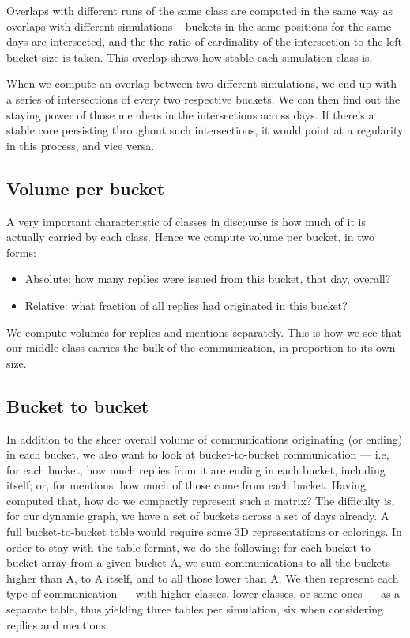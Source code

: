 \documentclass[10pt,oneside]{memoir}
\begin{document}
Overlaps with different runs of the same class are computed in the same way as overlaps with different simulations -- buckets in the same positions for the same days are intersected, and the the ratio of cardinality of the intersection to the left bucket size is taken.  This overlap shows how stable each simulation class is.


When we compute an overlap between two different simulations, we end up with a series of intersections of every two respective buckets.  We can then find out the staying power of those members in the intersections across days.  If there's a stable core persisting throughout such intersections, it would point at a regularity in this process, and vice versa.


\pagebreak \subsection{Volume per bucket}
\label{volumeperbucket}

A very important characteristic of classes in discourse is how much of it is actually carried by each class.  Hence we compute volume per bucket, in two forms:


\begin{itemize}


\item Absolute: how many replies were issued from this bucket, that day, overall?

\item Relative: what fraction of all replies had originated in this bucket?
\end{itemize}

We compute volumes for replies and mentions separately.  This is how we see that our middle class carries the bulk of the communication, in proportion to its own size.  


\subsection{Bucket to bucket}
\label{buckettobucket}

In addition to the sheer overall volume of communications originating (or ending) in each bucket, we also want to look at bucket-to-bucket communication --- i.e, for each bucket, how much replies from it are ending in each bucket, including itself; or, for mentions, how much of those come from each bucket.
Having computed that, how do we compactly represent such a matrix?  The difficulty is, for our dynamic graph, we have a set of buckets across a set of days already.  A full bucket-to-bucket table would require some 3D representations or colorings.  In order to stay with the table format, we do the following: for each bucket-to-bucket array from a given bucket A, we sum communications to all the buckets higher than A, to A itself, and to all those lower than A.  We then represent each type of communication --- with higher classes, lower classes, or same ones --- as a separate table, thus yielding three tables per simulation, six when considering replies and mentions.
\end{document}
